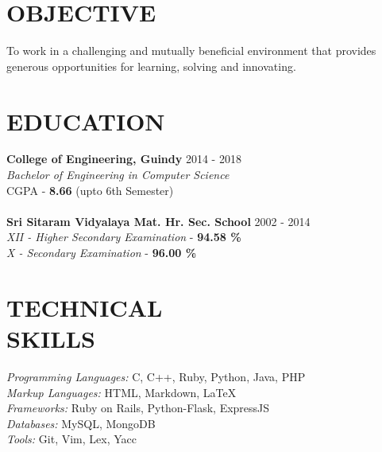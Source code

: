 \documentclass[margin, 10pt]{res} %
\begin{document}
\begin{resume}
\section{OBJECTIVE}
To work in a challenging and mutually beneficial environment that provides generous opportunities for learning, solving and innovating.
\section{EDUCATION}
{\bf College of Engineering, Guindy} \hfill 2014 - 2018 \\
{\sl Bachelor of Engineering in Computer Science} \\
{CGPA - \textbf{8.66} (upto 6th Semester)} \\
\\
{\bf Sri Sitaram Vidyalaya Mat. Hr. Sec. School} \hfill 2002 - 2014 \\
{\sl XII - Higher Secondary Examination} - {\textbf{94.58 \%}} \\
{\sl X - Secondary Examination} - {\textbf{96.00 \%}}
\section{TECHNICAL \\ SKILLS} 
    {\sl Programming Languages:} C, C++, Ruby, Python, Java, PHP \\
{\sl Markup Languages:} HTML, Markdown, LaTeX \\
{\sl Frameworks:} Ruby on Rails, Python-Flask, ExpressJS \\
{\sl Databases:} MySQL, MongoDB \\
{\sl Tools:} Git, Vim, Lex, Yacc

\end{resume}
\end{document}
